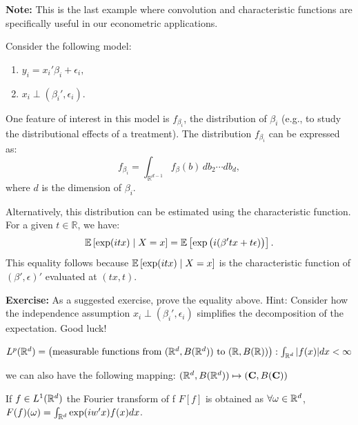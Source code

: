 \documentclass{article}
\begin{document}
\textbf{Note:} This is the last example where convolution and characteristic functions are specifically useful in our econometric applications.

\begin{example}
    Consider the following model:
    \begin{enumerate}
        \item \(y_i = x_i'\beta_i + \epsilon_i,\)
        \item \(x_i \perp (\beta_i', \epsilon_i).\)
    \end{enumerate}
    
    One feature of interest in this model is \(f_{\beta_i}\), the distribution of \(\beta_i\) (e.g., to study the distributional effects of a treatment). The distribution \(f_{\beta_i}\) can be expressed as:
    \[
    f_{\beta_i} = \int_{\mathbb{R}^{d-1}} f_\beta(b) \, db_2 \cdots db_d,
    \]
    where \(d\) is the dimension of \(\beta_i\).

    Alternatively, this distribution can be estimated using the characteristic function. For a given \(t \in \mathbb{R}\), we have:
    \[
    \mathbb{E}\left[\exp(itx) \mid X = x\right] = \mathbb{E}\left[\exp\big(i(\beta'tx + t\epsilon)\big)\right].
    \]
    This equality follows because \(\mathbb{E}\left[\exp(itx) \mid X = x\right]\) is the characteristic function of \((\beta', \epsilon)'\) evaluated at \((tx, t)\).

    \textbf{Exercise:} As a suggested exercise, prove the equality above. Hint: Consider how the independence assumption \(x_i \perp (\beta_i', \epsilon_i)\) simplifies the decomposition of the expectation. Good luck!
    
    
\end{example}

\begin{definition}
    \(L^{p}(\mathbb{R}^{d})=\left(\text{measurable functions from}\ (\mathbb{R}^{d}, B(\mathbb{R}^{d})) \ \text{to} \ (\mathbb{R}, B(\mathbb{R}))\right): \int_{\mathbb{R}^{d}}|f(x)|dx <\infty\)
\end{definition}

\begin{remark}
    we can also have the following mapping: \((\mathbb{R}^{d}, B(\mathbb{R}^{d}))\mapsto (\mathbf{C}, B(\mathbf{C}))\)
\end{remark}

\begin{definition}
    If \(f \in L^{1} (\mathbb{R}^{d})\) the Fourier transform of f \(F[f]\) is obtained as \(\forall \omega \in \mathbb{R}^{d}\), \(F(f)(\omega)= \int_{\mathbb{R}^{d}}\exp(iw'x)f(x)dx\).
\end{definition}
\end{document}
